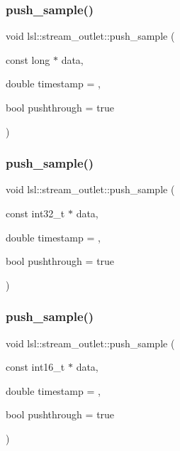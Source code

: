 \subsubsection{\texorpdfstring{push\+\_\+sample()}{push\_sample()}\hspace{0.1cm}{\footnotesize\ttfamily [11/15]}}
{\footnotesize\ttfamily void lsl\+::stream\+\_\+outlet\+::push\+\_\+sample (\begin{DoxyParamCaption}\item[{const long $\ast$}]{data,  }\item[{double}]{timestamp = {},  }\item[{bool}]{pushthrough = {\ttfamily true} }\end{DoxyParamCaption})\hspace{0.3cm}{\ttfamily [inline]}}

\mbox{\label{classlsl_1_1stream__outlet_aff1709d7bbf628e9b14d18444c7ac237}} 
\subsubsection{\texorpdfstring{push\+\_\+sample()}{push\_sample()}\hspace{0.1cm}{\footnotesize\ttfamily [12/15]}}
{\footnotesize\ttfamily void lsl\+::stream\+\_\+outlet\+::push\+\_\+sample (\begin{DoxyParamCaption}\item[{const int32\+\_\+t $\ast$}]{data,  }\item[{double}]{timestamp = {},  }\item[{bool}]{pushthrough = {\ttfamily true} }\end{DoxyParamCaption})\hspace{0.3cm}{\ttfamily [inline]}}

\mbox{\label{classlsl_1_1stream__outlet_ae67672d4aa82d500e0a192d38f64d6fe}} 
\subsubsection{\texorpdfstring{push\+\_\+sample()}{push\_sample()}\hspace{0.1cm}{\footnotesize\ttfamily [13/15]}}
{\footnotesize\ttfamily void lsl\+::stream\+\_\+outlet\+::push\+\_\+sample (\begin{DoxyParamCaption}\item[{const int16\+\_\+t $\ast$}]{data,  }\item[{double}]{timestamp = {},  }\item[{bool}]{pushthrough = {\ttfamily true} }\end{DoxyParamCaption})\hspace{0.3cm}{\ttfamily [inline]}}

